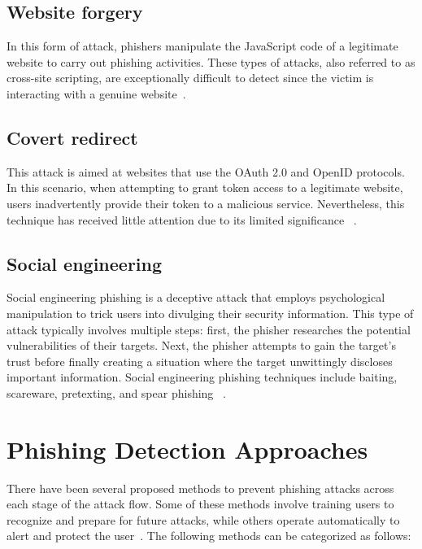 \documentclass[final]{cvpr}
\begin{document}
\subsection{Website forgery}

In this form of attack, phishers manipulate the JavaScript code of a legitimate website to carry out phishing activities. These types of attacks, also referred to as cross-site scripting, are exceptionally difficult to detect since the victim is interacting with a genuine website~\cite{lam2009counteracting}.

\subsection{Covert redirect}

This attack is aimed at websites that use the OAuth 2.0 and OpenID protocols. In this scenario, when attempting to grant token access to a legitimate website, users inadvertently provide their token to a malicious service.  Nevertheless, this technique has received little attention due to its limited significance ~\cite{Waziri20151WF}.

\subsection{Social engineering}

Social engineering phishing is a deceptive attack that employs psychological manipulation to trick users into divulging their security information. This type of attack typically involves multiple steps: first, the phisher researches the potential vulnerabilities of their targets. Next, the phisher attempts to gain the target's trust before finally creating a situation where the target unwittingly discloses important information. Social engineering phishing techniques include baiting, scareware, pretexting, and spear phishing ~\cite{krombholz2015advanced}.

\section{Phishing Detection Approaches}
\label{sec:Phishing Detection Approaches}

There have been several proposed methods to prevent phishing attacks across each stage of the attack flow. Some of these methods involve training users to recognize and prepare for future attacks, while others operate automatically to alert and protect the user~\cite{phishing-detection}. The following methods can be categorized as follows:
\end{document}
